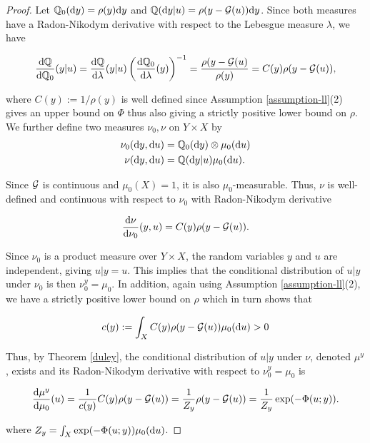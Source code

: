 \begin{proof}
  Let $\mathbb{Q}_0(\text{d} y) = \rho(y)\text{d} y$ and $\mathbb{Q}(\text{d} y|u) = \rho(y - \mathcal{G} (u))\text{d} y$. Since both measures have a Radon-Nikodym derivative with respect to the Lebesgue measure $\lambda$, we have

  \begin{equation*}
    \frac{\text{d} \mathbb{Q}}{\text{d} \mathbb{Q}_0}(y|u) = \frac{\text{d} \mathbb{Q}}{\text{d} \lambda}(y|u)\left(\frac{\text{d} \mathbb{Q}_0}{\text{d} \lambda}(y)\right)^{-1} = \frac{\rho(y - \mathcal{G} (u)}{\rho(y)} = C(y)\rho(y - \mathcal{G} (u)),
  \end{equation*}

  where $C(y) := 1 / \rho(y)$ is well defined since Assumption \ref{assumption-ll}(2) gives an upper bound on $\Phi$ thus also giving a strictly positive lower bound on $\rho$. We further define two measures $\nu_0, \nu$ on $Y \times X$ by
  \begin{equation*}
    \begin{aligned}
      \nu_0(\text{d} y, \text{d} u) &= \mathbb{Q}_0(\text{d} y) \otimes \mu_0(\text{d} u)\\
      \nu(\text{d} y, \text{d} u) &= \mathbb{Q}(\text{d} y|u) \mu_0(\text{d} u).
    \end{aligned}
  \end{equation*}
  
  Since $\mathcal{G}$ is continuous and $\mu_0(X) = 1$, it is also $\mu_0$-measurable. Thus, $\nu$ is well-defined and continuous with respect to $\nu_0$ with Radon-Nikodym derivative

  \begin{equation*}
    \frac{\text{d} \nu}{\text{d} \nu_0}(y, u) = C(y)\rho(y - \mathcal{G}(u)).
  \end{equation*}

  Since $\nu_0$ is a product measure over $Y \times X$, the random variables $y$ and $u$ are independent, giving $u|y = u$. This implies that the conditional distribution of $u|y$ under $\nu_0$ is then $\nu_0^y = \mu_0$. In addition, again using Assumption \ref{assumption-ll}(2), we have a strictly positive lower bound on $\rho$ which in turn shows that

  \begin{equation*}
    c(y) := \int_X C(y)\rho(y - \mathcal{G}(u))\mu_0(\text{d} u) > 0 
  \end{equation*}

  Thus, by Theorem \ref{duley}, the conditional distribution of $u|y$ under $\nu$, denoted $\mu^y$, exists and its Radon-Nikodym derivative with respect to $\nu_0^y = \mu_0$ is

  \begin{equation*}
    \frac{\text{d} \mu^y}{\text{d} \mu_0}(u) = \frac1{c(y)}C(y)\rho(y - \mathcal{G} (u)) =  \frac1{Z_y}\rho(y - \mathcal{G} (u)) = \frac1{Z_y}\exp(-\Phi(u;y)).
  \end{equation*}
  
  where $Z_y = \int_X\exp(-\Phi(u;y))\mu_0(\text{d} u)$.
\end{proof}

